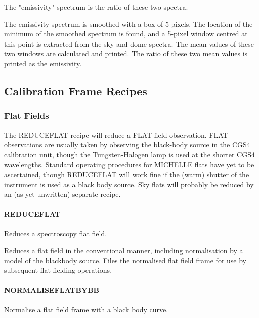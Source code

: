 \documentclass[twoside,11pt]{article}
\renewcommand{\_}{\texttt{\symbol{95}}}
\begin{document}
The "emissivity" spectrum is the ratio of these two spectra.



The emissivity spectrum is smoothed with a box of 5 pixels.  The
location of the minimum of the smoothed spectrum is found, and a
5-pixel window centred at this point is extracted from the sky and
dome spectra.  The mean values of these two windows are calculated and
printed.  The ratio of these two mean values is printed as the
emissivity.


\subsection{Calibration Frame Recipes}

\subsubsection{Flat Fields}

The REDUCE\_FLAT recipe will reduce a FLAT field observation. FLAT
observations are usually taken by observing the black-body source in
the CGS4 calibration unit, though the Tungsten-Halogen lamp is used at
the shorter CGS4 wavelengths. Standard operating procedures for
MICHELLE flats have yet to be ascertained, though REDUCE\_FLAT will
work fine if the (warm) shutter of the instrument is used as a black
body source. Sky flats will probably be reduced by an (as yet
unwritten) separate recipe.

\paragraph{REDUCE\_FLAT\label{REDUCE_FLAT}}


Reduces a spectroscopy flat field.


\mbox{}


Reduces a flat field in the conventional manner, including
normalisation by a model of the blackbody source. Files the normalised
flat field frame for use by subsequent flat fielding operations.


\paragraph{\_NORMALISE\_FLAT\_BY\_BB\_\label{_NORMALISE_FLAT_BY_BB_}}


Normalise a flat field frame with a black body curve.
\end{document}
